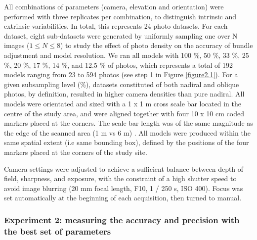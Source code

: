 All combinations of parameters (camera, elevation and orientation) were performed with three replicates per combination, to distinguish intrinsic and extrinsic variabilities. In total, this represents 24 photo datasets. For each dataset, eight sub-datasets were generated by uniformly sampling one over N images ($1 \leq N \leq 8$) to study the effect of photo density on the accuracy of bundle adjustment and model resolution. We ran all models with 100 \%, 50 \%, 33 \%, 25 \%, 20 \%, 17 \%, 14 \%, and 12.5 \% of photos, which represents a total of 192 models ranging from 23 to 594 photos (see step 1 in Figure \ref{figure2.1}). For a given subsampling level (\%), datasets constituted of both nadiral and oblique photos, by definition, resulted in higher camera densities than pure nadiral. All models were orientated and sized with a 1 x 1 m cross scale bar located in the centre of the study area, and were aligned together with four 10 x 10 cm coded markers placed at the corners. The scale bar length was of the same magnitude as the edge of the scanned area (1 m vs 6 m) \citep{vdi/vde_optical_2002}. All models were produced within the same spatial extent (i.e same bounding box), defined by the positions of the four markers placed at the corners of the study site.

Camera settings were adjusted to achieve a sufficient balance between depth of field, sharpness, and exposure, with the constraint of a high shutter speed to avoid image blurring (20 mm focal length, F10, 1 / 250 s, ISO 400). Focus was set automatically at the beginning of each acquisition, then turned to manual.

\subsubsection{Experiment 2: measuring the accuracy and precision with the best set of parameters}\label{chapitre2_2.1.2}

